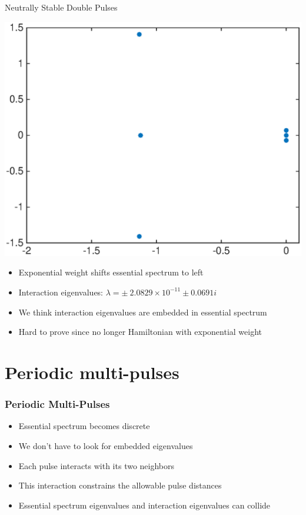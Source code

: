 \documentclass[16pt]{beamer}
\begin{document}
\begin{frame}{Neutrally Stable Double Pulses}
	\fontsize{14}{7.2}\selectfont
	\begin{center}
		\includegraphics[width=0.5\linewidth]{images/stableeigweighted2}
	\end{center}
	\begin{itemize}
		\item Exponential weight shifts essential spectrum to left
		\item Interaction eigenvalues: $\lambda = \pm \: 2.0829 \times 10^{-11} \pm 0.0691i$
		\item We think interaction eigenvalues are embedded in essential spectrum
		\item Hard to prove since no longer Hamiltonian with exponential weight
	\end{itemize}
\end{frame}

\section{Periodic multi-pulses}

\begin{frame}
	\frametitle{Periodic Multi-Pulses}
	\fontsize{16}{7.2}\selectfont
	\begin{itemize}
		\item Essential spectrum becomes discrete
		\vspace{0.5cm}
		\item We don't have to look for embedded eigenvalues
		\vspace{0.5cm}
		\item Each pulse interacts with its two neighbors
		\vspace{0.5cm}
		\item This interaction constrains the allowable pulse distances
		\vspace{0.5cm}
		\item Essential spectrum eigenvalues and interaction eigenvalues can collide
	\end{itemize}
\end{frame}
\end{document}
